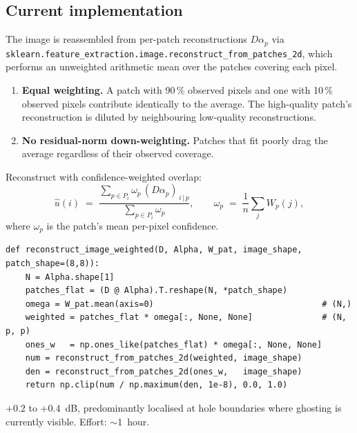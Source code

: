\documentclass[11pt,a4paper]{article}
\begin{document}
\subsection*{Current implementation}

The image is reassembled from per-patch reconstructions $D\alpha_p$ via
\texttt{sklearn.feature\_extraction.image.reconstruct\_from\_patches\_2d},
which performs an unweighted arithmetic mean over the patches covering
each pixel.

\begin{issuebox}
\begin{enumerate}[leftmargin=1.2em,itemsep=2pt]
    \item \textbf{Equal weighting.} A patch with 90\,\% observed pixels and
    one with 10\,\% observed pixels contribute identically to the average.
    The high-quality patch's reconstruction is diluted by neighbouring
    low-quality reconstructions.
    \item \textbf{No residual-norm down-weighting.} Patches that fit
    poorly drag the average regardless of their observed coverage.
\end{enumerate}
\end{issuebox}

\begin{fixbox}
Reconstruct with confidence-weighted overlap:
\begin{equation}
    \hat u(i) \;=\; \frac{\sum_{p\in P_i} \omega_p\,(D\alpha_p)_{\,i\,|\,p}}
                          {\sum_{p\in P_i} \omega_p},
    \qquad
    \omega_p \;=\; \frac{1}{n}\sum_{j} W_p(j),
\end{equation}
where $\omega_p$ is the patch's mean per-pixel confidence.
\end{fixbox}

\begin{lstlisting}[caption={Confidence-weighted overlap reconstruction.}]
def reconstruct_image_weighted(D, Alpha, W_pat, image_shape, patch_shape=(8,8)):
    N = Alpha.shape[1]
    patches_flat = (D @ Alpha).T.reshape(N, *patch_shape)
    omega = W_pat.mean(axis=0)                                  # (N,)
    weighted = patches_flat * omega[:, None, None]              # (N, p, p)
    ones_w   = np.ones_like(patches_flat) * omega[:, None, None]
    num = reconstruct_from_patches_2d(weighted, image_shape)
    den = reconstruct_from_patches_2d(ones_w,   image_shape)
    return np.clip(num / np.maximum(den, 1e-8), 0.0, 1.0)
\end{lstlisting}

\begin{impactbox}
$+0.2$ to $+0.4$~dB, predominantly localised at hole boundaries where
ghosting is currently visible. Effort: $\sim$1~hour.
\end{impactbox}
\end{document}

